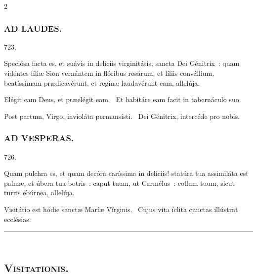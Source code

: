 \documentclass[9pt,twoside]{extarticle}
\begin{document}
\begin{multicols}{2}
{{\subsubsection*{\center \textsc{AD LAUDES.}}
\begin{tightlist}{}
\item {} 723.
\item {} Speciósa facta es, et suávis in delíciis virginitátis, sancta Dei Génitrix~: quam vidéntes fíliæ Sion vernántem in flóribus rosárum, et líliis convállium, beatíssimam prædicavérunt, et regínæ laudavérunt eam, allelúja.
\item {} Elégit eam Deus, et præelégit eam. ~Et habitáre eam facit in tabernáculo suo.
\item {} Post partum, Virgo, invioláta permansísti. ~Dei Génitrix, intercéde pro nobis.
\item {}
\end{tightlist}

\subsubsection*{\center \textsc{AD VESPERAS.}}
\begin{tightlist}{}
\item {} 726.
\item {} Quam pulchra es, et quam decóra caríssima in delíciis! statúra tua assimiláta est palmæ, et úbera tua botris~: caput tuum, ut Carmélus~: collum tuum, sicut turris ebúrnea, allelúja.
\item {} Visitátio est hódie sanctæ Maríæ Vírginis. ~Cujus vita íclita cunctas illústrat ecclésias.
\item {}
\end{tightlist}

\begin{center}\textcolor{red}{\rule{\linewidth}{0.5pt}} \end{center}

\subsection*{\center \textsc{\\
Visitationis.}}
}}
\end{multicols}
\end{document}
